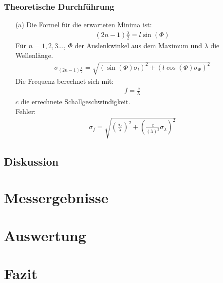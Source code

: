 \documentclass[12pt]{scrartcl}
\begin{document}
\subsubsection{Theoretische Durchführung}
\begin{enumerate}
\item[(a)]
Die Formel für die erwarteten Minima ist:
\begin{align}
(2n-1)\frac{\lambda}{2} = l \sin(\Phi)
\end{align}
Für $n = 1,2,3...$, $\Phi$ der Auslenkwinkel aus dem Maximum und $\lambda$ die Wellenlänge.\\
\begin{align}
\sigma_{(2n-1)\frac{\lambda}{2}} = \sqrt{
\left(\sin(\Phi)\sigma_l\right)^2+
\left(l \cos(\Phi)\sigma_{\Phi}\right)^2}
\end{align}
Die Frequenz berechnet sich mit:
\begin{align}
f = \frac{c}{\lambda} 
\end{align}
$c$ die errechnete Schallgeschwindigkeit.\\
Fehler:
\begin{align}
\sigma_f = \sqrt{
\left(\frac{\sigma_{c}}{\lambda}\right)^2+
\left(\frac{c}{(\lambda)^2}\sigma_{\lambda}\right)^2}
\end{align}
\end{enumerate}
\subsection{Diskussion}




\section{Messergebnisse}



\section{Auswertung}


\section{Fazit}


\end{document}
